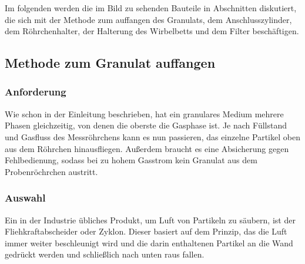Im folgenden werden die im Bild zu sehenden Bauteile in Abschnitten diskutiert, die sich mit der Methode zum auffangen des Granulats, dem Anschlusszylinder, dem Röhrchenhalter, der Halterung des Wirbelbetts und dem Filter beschäftigen.


\subsection{Methode zum Granulat auffangen}

\subsubsection{Anforderung}

Wie schon in der Einleitung beschrieben, hat ein granulares Medium mehrere Phasen gleichzeitig, von denen die oberste die Gasphase ist. Je nach Füllstand und Gasfluss des Messröhrchens kann es nun passieren, das einzelne Partikel oben aus dem Röhrchen hinausfliegen. Außerdem braucht es eine Absicherung gegen Fehlbedienung, sodass bei zu hohem Gasstrom kein Granulat aus dem Probenröchrchen austritt.

\subsubsection{Auswahl}

Ein in der Industrie übliches Produkt, um Luft von Partikeln zu säubern, ist der Fliehkraftabscheider oder Zyklon. Dieser basiert auf dem Prinzip, das die Luft immer weiter beschleunigt wird und die darin enthaltenen Partikel an die Wand gedrückt werden und schließlich nach unten raus fallen. \\


